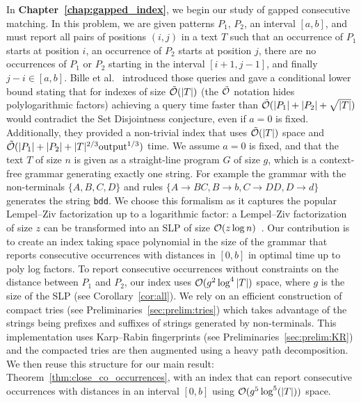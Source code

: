 In \textbf{Chapter~\ref{chap:gapped_index}}, we begin our study of gapped consecutive matching. In this problem, we are given patterns $P_1$, $P_2$, an interval $[a,b]$, and must report all pairs of positions $(i,j)$ in a text $T$ such that an occurrence of $P_1$ starts at position $i$, an occurrence of $P_2$ starts at position $j$, there are no occurrences of $P_1$ or $P_2$ starting in the interval $[i+1,j-1]$, and finally $j-i \in [a,b]$.
Bille et al.~\cite{bille2022gapped} introduced those queries and gave a conditional lower bound stating that for indexes of size $\tilde {\mathcal{O}}(|T|)$ (the $\tilde {\mathcal{O}}$ notation hides polylogarithmic factors) achieving a query time faster than $\tilde {\mathcal{O}}(|P_1|+|P_2|+\sqrt{|T|})$ would contradict the Set Disjointness conjecture, even if $a=0$ is fixed. Additionally, they provided a non-trivial index that uses $\tilde {\mathcal{O}}(|T|)$ space and $\tilde {\mathcal{O}} (|P_1| +|P_2| + |T|^{2/3}\mathrm{output}^{1/3})$ time. 
We assume $a=0$ is fixed, and that the text $T$ of size $n$ is given as a straight-line program $G$ of size $g$, which is a context-free grammar generating exactly one string. For example the grammar with the non-terminals $\{A,B,C,D\}$ and rules $\{A \rightarrow BC, B \rightarrow b, C \rightarrow DD, D\rightarrow d \}$ generates the string \texttt{bdd}.
We choose this formalism as it captures the popular Lempel--Ziv factorization up to a logarithmic factor: a Lempel--Ziv factorization of size $z$ can be transformed into an SLP of size $\mathcal{O}(z\log n)$~\cite{CharikarLLPPRSS02,Rytter02}.
%
Our contribution is to create an index taking space polynomial in the size of the grammar that reports consecutive occurrences with distances in $[0,b]$ in optimal time up to poly log factors.
To report consecutive occurrences without constraints on the distance between $P_1$ and $P_2$, our index uses $\mathcal{O}(g^2\log^4|T|)$ space, where $g$ is the size of the SLP (see Corollary~\ref{cor:all}).
We rely on an efficient construction of compact tries (see Preliminaries~\ref{sec:prelim:tries}) which takes advantage of the strings being prefixes and suffixes of strings generated by non-terminals. This implementation uses Karp--Rabin fingerprints (see Preliminaries~\ref{sec:prelim:KR}) and the compacted tries are then augmented using a heavy path decomposition.
We then reuse this structure for our main result: Theorem~\ref{thm:close_co_occurrences}, with an index that can report consecutive occurrences with distances in an interval $[0,b]$ using $\mathcal{O} (g^5\log^5(|T|))$ space.
